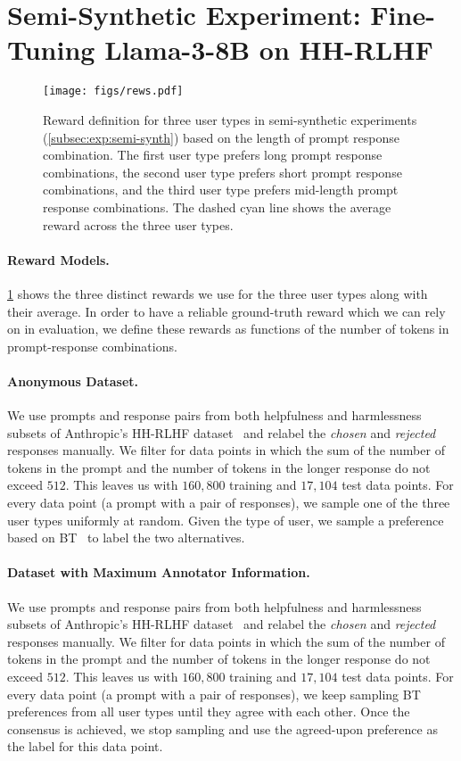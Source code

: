 \section{Semi-Synthetic Experiment: Fine-Tuning Llama-3-8B on HH-RLHF}
\label{app:llama}

\begin{figure}
    \centering
    \texttt{[image: figs/rews.pdf]}
    \caption{Reward definition for three user types in semi-synthetic experiments (\cref{subsec:exp:semi-synth}) based on the length of prompt response combination. The first user type prefers long prompt response combinations, the second user type prefers short prompt response combinations, and the third user type prefers mid-length prompt response combinations. The dashed cyan line shows the average reward across the three user types.}
    \label{fig:app:rewards}
\end{figure}

\paragraph{Reward Models.}
\cref{fig:app:rewards} shows the three distinct rewards we use for the three user types along with their average.
In order to have a reliable ground-truth reward which we can rely on in evaluation, we define these rewards as functions of the number of tokens in prompt-response combinations.

\paragraph{Anonymous Dataset.}
We use prompts and response pairs from both helpfulness and harmlessness subsets of Anthropic's HH-RLHF dataset~\citep{hh-rlhf} and relabel the \textit{chosen} and \textit{rejected} responses manually.
We filter for data points in which the sum of the number of tokens in the prompt and the number of tokens in the longer response do not exceed $512$.
This leaves us with $160,800$ training and $17,104$ test data points. 
For every data point (a prompt with a pair of responses), we sample one of the three user types uniformly at random.
Given the type of user, we sample a preference based on BT~\citep{bt} to label the two alternatives.

\paragraph{Dataset with Maximum Annotator Information.}
We use prompts and response pairs from both helpfulness and harmlessness subsets of Anthropic's HH-RLHF dataset~\citep{hh-rlhf} and relabel the \textit{chosen} and \textit{rejected} responses manually.
We filter for data points in which the sum of the number of tokens in the prompt and the number of tokens in the longer response do not exceed $512$.
This leaves us with $160,800$ training and $17,104$ test data points. 
For every data point (a prompt with a pair of responses), we keep sampling BT~\citep{bt} preferences from all user types until they agree with each other.
Once the consensus is achieved, we stop sampling and use the agreed-upon preference as the label for this data point.

